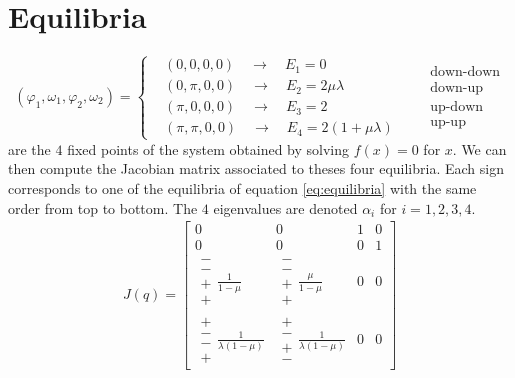 \documentclass[11 pt]{article}
\begin{document}
\section{Equilibria}
\begin{equation}
    (\varphi_1, \omega_1, \varphi_2, \omega_2) =
    \begin{cases}
        & (0, 0, 0, 0) \quad \rightarrow \quad E_1 = 0\\
        & (0, \pi, 0, 0) \quad \rightarrow \quad E_2 = 2\mu \lambda\\
        & (\pi, 0, 0, 0) \quad \rightarrow \quad E_3 = 2\\
        & (\pi, \pi, 0, 0) \quad \rightarrow \quad E_4 = 2(1+\mu \lambda)
    \end{cases} \quad
    \begin{aligned}
        &\text{down-down}\\
        &\text{down-up}\\
        &\text{up-down}\\
        &\text{up-up}
    \end{aligned}
    \label{eq:equilibria}
\end{equation}
are the $4$ fixed points of the system obtained by solving $f(x)=0$ for $x$. We can then compute the Jacobian matrix associated to theses four equilibria. Each sign corresponds to one of the equilibria of equation \eqref{eq:equilibria} with the same order from top to bottom. The $4$ eigenvalues are denoted $\alpha_i$ for $i=1,2,3,4$.
\begin{align}
    J(q) =
    \begin{bmatrix}
        0 & 0 & 1 & 0\\
        0 & 0 & 0 & 1\\
        \mathrel{\substack{-\\-\\+\\+}} \frac{1}{1-\mu} & \mathrel{\substack{-\\-\\+\\+}}\frac{\mu}{1 - \mu} & 0 & 0\\
        \mathrel{\substack{+\\-\\-\\+}}\frac{1}{\lambda(1-\mu)} & \mathrel{\substack{+\\-\\+\\-}}\frac{1}{\lambda(1 - \mu)} & 0 & 0
    \end{bmatrix}
\end{align}
\end{document}
